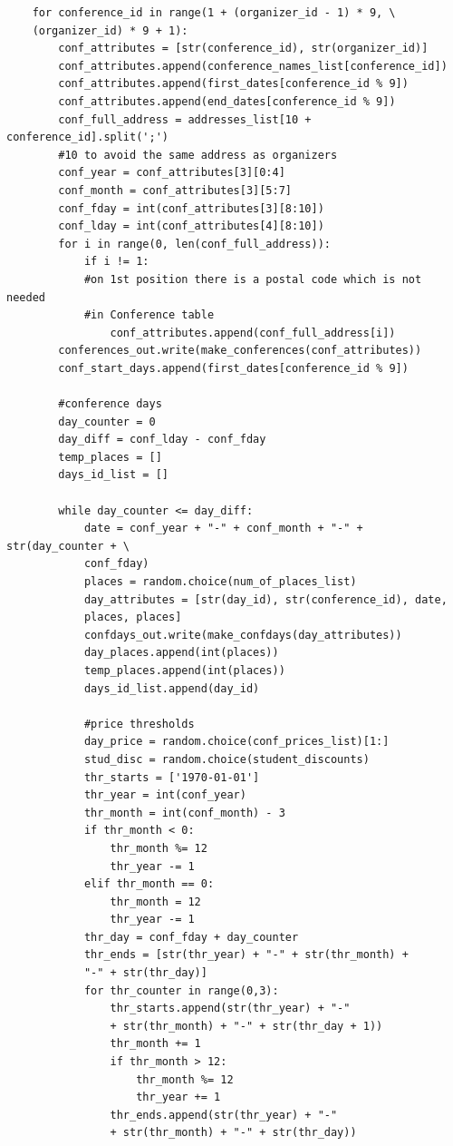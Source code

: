 \documentclass[12pt, a4paper]{mwrep}
\begin{document}
\begin{lstlisting}
    for conference_id in range(1 + (organizer_id - 1) * 9, \
    (organizer_id) * 9 + 1):
        conf_attributes = [str(conference_id), str(organizer_id)]
        conf_attributes.append(conference_names_list[conference_id])
        conf_attributes.append(first_dates[conference_id % 9])
        conf_attributes.append(end_dates[conference_id % 9])
        conf_full_address = addresses_list[10 + conference_id].split(';') 
        #10 to avoid the same address as organizers
        conf_year = conf_attributes[3][0:4]
        conf_month = conf_attributes[3][5:7]
        conf_fday = int(conf_attributes[3][8:10])
        conf_lday = int(conf_attributes[4][8:10])
        for i in range(0, len(conf_full_address)):
            if i != 1: 
            #on 1st position there is a postal code which is not needed 
            #in Conference table
                conf_attributes.append(conf_full_address[i])
        conferences_out.write(make_conferences(conf_attributes))
        conf_start_days.append(first_dates[conference_id % 9])
        
        #conference days
        day_counter = 0
        day_diff = conf_lday - conf_fday  
        temp_places = []
        days_id_list = []
        
        while day_counter <= day_diff:
            date = conf_year + "-" + conf_month + "-" + str(day_counter + \
            conf_fday)
            places = random.choice(num_of_places_list)
            day_attributes = [str(day_id), str(conference_id), date, 
            places, places]
            confdays_out.write(make_confdays(day_attributes))
            day_places.append(int(places))
            temp_places.append(int(places))  
            days_id_list.append(day_id)
            
            #price thresholds
            day_price = random.choice(conf_prices_list)[1:]
            stud_disc = random.choice(student_discounts)
            thr_starts = ['1970-01-01']
            thr_year = int(conf_year)
            thr_month = int(conf_month) - 3
            if thr_month < 0:
                thr_month %= 12
                thr_year -= 1
            elif thr_month == 0:
                thr_month = 12
                thr_year -= 1            
            thr_day = conf_fday + day_counter
            thr_ends = [str(thr_year) + "-" + str(thr_month) + 
            "-" + str(thr_day)]
            for thr_counter in range(0,3):
                thr_starts.append(str(thr_year) + "-" 
                + str(thr_month) + "-" + str(thr_day + 1))
                thr_month += 1
                if thr_month > 12:
                    thr_month %= 12
                    thr_year += 1
                thr_ends.append(str(thr_year) + "-" 
                + str(thr_month) + "-" + str(thr_day))            
            

\end{lstlisting}
\end{document}
